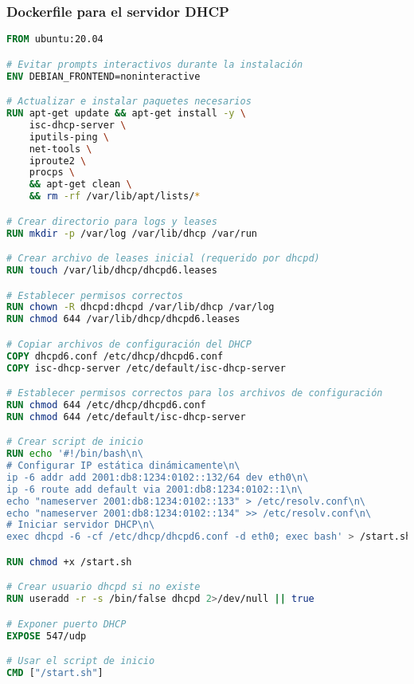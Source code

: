 \newpage

\subsubsection{Dockerfile para el servidor DHCP}
\label{Apendice2:dockerfile_dhcp}
\begin{lstlisting}[language=Dockerfile]
FROM ubuntu:20.04

# Evitar prompts interactivos durante la instalación
ENV DEBIAN_FRONTEND=noninteractive

# Actualizar e instalar paquetes necesarios
RUN apt-get update && apt-get install -y \
    isc-dhcp-server \
    iputils-ping \
    net-tools \
    iproute2 \
    procps \
    && apt-get clean \
    && rm -rf /var/lib/apt/lists/*

# Crear directorio para logs y leases
RUN mkdir -p /var/log /var/lib/dhcp /var/run

# Crear archivo de leases inicial (requerido por dhcpd)
RUN touch /var/lib/dhcp/dhcpd6.leases

# Establecer permisos correctos
RUN chown -R dhcpd:dhcpd /var/lib/dhcp /var/log
RUN chmod 644 /var/lib/dhcp/dhcpd6.leases

# Copiar archivos de configuración del DHCP
COPY dhcpd6.conf /etc/dhcp/dhcpd6.conf
COPY isc-dhcp-server /etc/default/isc-dhcp-server

# Establecer permisos correctos para los archivos de configuración
RUN chmod 644 /etc/dhcp/dhcpd6.conf
RUN chmod 644 /etc/default/isc-dhcp-server

# Crear script de inicio
RUN echo '#!/bin/bash\n\
# Configurar IP estática dinámicamente\n\
ip -6 addr add 2001:db8:1234:0102::132/64 dev eth0\n\
ip -6 route add default via 2001:db8:1234:0102::1\n\
echo "nameserver 2001:db8:1234:0102::133" > /etc/resolv.conf\n\
echo "nameserver 2001:db8:1234:0102::134" >> /etc/resolv.conf\n\
# Iniciar servidor DHCP\n\
exec dhcpd -6 -cf /etc/dhcp/dhcpd6.conf -d eth0; exec bash' > /start.sh

RUN chmod +x /start.sh

# Crear usuario dhcpd si no existe
RUN useradd -r -s /bin/false dhcpd 2>/dev/null || true

# Exponer puerto DHCP
EXPOSE 547/udp

# Usar el script de inicio
CMD ["/start.sh"] 
\end{lstlisting}

